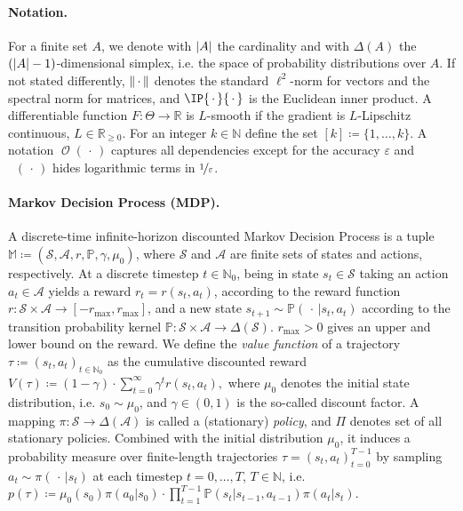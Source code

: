 \documentclass{article}
\theoremstyle{plain}
\theoremstyle{definition}
\theoremstyle{remark}
\def\RR{{\mathbb{R}}}
\def\PP{{\mathbb{P}}}
\def\NN{{\mathbb{N}}}
\def\SS{{\mathcal{S}}}
\def\AA{{\mathcal{A}}}
\DeclareMathOperator{\OOTildeSym}{\widetilde{\mathcal{O}}}
\DeclareMathOperator{\OOSym}{\mathcal{O}}
\newcommand{\OOTilde}[1]{{\OOTildeSym\!\left(#1\right)}}
\newcommand{\OO}[1]{{\OOSym\!\left(#1\right)}}
\def\epsilon{{\varepsilon}}
\newcommand{\innerEmpty}{\,\cdot\,}
\DeclarePairedDelimiter{\abs}{\lvert}{\rvert}
\DeclarePairedDelimiter{\norm}{\lVert}{\rVert}
\newcommand{\define}{\coloneqq}
\def\ss{{s}}
\def\NN{{\mathbb{N}}}
\def\MM{{\mathbb{M}}}
\newcommand{\setm}[1]{[#1]}
\def\XX{{\Theta}}
\def\aa{{a}}
\def\ss{{s}}
\begin{document}
\paragraph{Notation.}
For a finite set $A$, we denote with $\abs{A}$ the cardinality and with
$\Delta(A)$ the $(\abs{A}-1)$-dimensional simplex, i.e. the space of
probability distributions over $A$. If not stated differently,
$\norm{\innerEmpty{}}$ denotes the standard $\ell^2$-norm for vectors and
the spectral norm for matrices, and $\IP{\innerEmpty{}}{\innerEmpty{}}$ is
the Euclidean inner product. A differentiable function $F: \XX \to \RR$ is
$L$-smooth if the gradient is $L$-Lipschitz continuous, $L \in \RR_{\geq
  0}$. For an integer $k\in \NN$ define the set $\setm{k} \define \{1,
 \ldots, k\}$. A notation $\OO{\innerEmpty{}}$ captures all dependencies
except for the accuracy $\epsilon$ and $\OOTilde{\innerEmpty{}}$ hides
logarithmic terms in $\nicefrac{1}{\epsilon}$.

\paragraph{Markov Decision Process (MDP).}
A discrete-time infinite-horizon discounted Markov Decision Process is a
tuple $\MM \define (\SS, \AA, r, \PP, \gamma, \mu_0)$, where $\SS$ and
$\AA$ are finite sets of states and actions, respectively. At a discrete
timestep $t \in \NN_0$, being in state $\ss_t \in \SS$ taking an action
$\aa_t \in \AA$ yields a reward $r_t = r(\ss_t, \aa_t)$, according to the
reward function $r: \SS \times \AA \to [-r_{\max}, r_{\max}]$, and a new
state $\ss_{t+1} \sim \PP(\innerEmpty{}\vert \ss_t, \aa_t)$ according to
the transition probability kernel $\PP: \SS \times \AA \to \Delta(\SS)$.
$r_{\max} > 0$ gives an upper and lower bound on the reward. We define the
\emph{value function} of a trajectory $\tau \define (\ss_t, \aa_t)_{t \in
  \NN_0}$ as the cumulative discounted reward $ V(\tau) \define (1-\gamma)
 \cdot \sum_{t=0}^{\infty} \gamma^t r(\ss_t, \aa_t),$ where $\mu_0$ denotes
the initial state distribution, i.e. $\ss_0 \sim \mu_0$, and $\gamma \in
 (0,1)$ is the so-called discount factor. A mapping $\pi: \SS \to
 \Delta(\AA)$ is called a (stationary) \emph{policy}, and $\Pi$ denotes set
of all stationary policies. Combined with the initial distribution $\mu_0$,
it induces a probability measure over finite-length trajectories $\tau =
 (\ss_t, \aa_t)_{t=0}^{T-1}$ by sampling $\aa_t \sim \pi(\innerEmpty{}\vert
 \ss_t)$ at each timestep $t = 0,\ldots, T$, $T \in \NN$, i.e. $p(\tau)
 \define \mu_0(\ss_0) \pi(\aa_0\vert \ss_0) \cdot \prod_{t=1}^{T-1}
 \PP(\ss_t\vert \ss_{t-1}, \aa_{t-1}) \pi(\aa_t\vert \ss_t)$.
\end{document}
